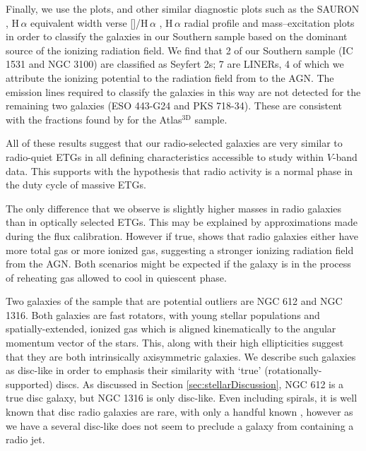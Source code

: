 Finally, we use the \citet[; BPT]{Baldwin1981} plots, and other similar diagnostic plots such as the SAURON \citep{Sarzi2010}, H\,$\alpha$ equivalent width verse []/H\,$\alpha$ \citep[WHaN2;][]{CidFernandes2011}, H\,$\alpha$ radial profile and mass--excitation \citep[MEx;][]{Nyland2016} plots in order to classify the galaxies in our Southern sample based on the dominant source of the ionizing radiation field. We find that 2 of our Southern sample (IC 1531 and NGC 3100) are classified as Seyfert 2s; 7 are LINERs, 4 of which we attribute the ionizing potential to the radiation field from to the AGN. The emission lines required to classify the galaxies in this way are not detected for the remaining two galaxies (ESO 443-G24 and PKS 718-34). These are consistent with the fractions found by \citet{Nyland2016} for the Atlas$^\text{3D}$ sample.

All of these results suggest that our radio-selected galaxies are very similar to radio-quiet ETGs in all defining characteristics accessible to study within $V$-band data. This supports with the hypothesis that radio activity is a normal phase in the duty cycle of massive ETGs. 

The only difference that we observe is slightly higher  masses in radio galaxies than in optically selected ETGs. This may be explained by approximations made during the flux calibration. However if true, shows that radio galaxies either have more total gas or more ionized gas, suggesting a stronger ionizing radiation field from the AGN. Both scenarios might be expected if the galaxy is in the process of reheating gas allowed to cool in quiescent phase. 

Two galaxies of the sample that are potential outliers are NGC 612 and NGC 1316. Both galaxies are fast rotators, with young stellar populations and spatially-extended, ionized gas which is aligned kinematically to the angular momentum vector of the stars. This, along with their high ellipticities suggest that they are both intrinsically axisymmetric galaxies. We describe such galaxies as disc-like in order to emphasis their similarity with `true' (rotationally-supported) discs. As discussed in Section \ref{sec:stellarDiscussion}, NGC 612 is a true disc galaxy, but NGC 1316 is only disc-like. Even including spirals, it is well known that disc radio galaxies are rare, with only a handful known \citep[e.g.][]{Heckman1982, Ledlow1998, Hota2011a, Morganti2011, Mao2015}, however as we have a several disc-like does not seem to preclude a galaxy from containing a radio jet. %

